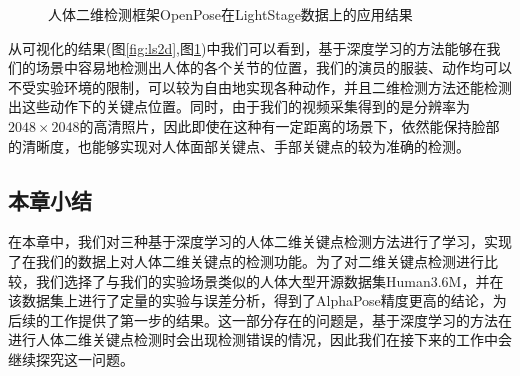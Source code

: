 \begin{figure}[htbp]
    \centering
    \caption{人体二维检测框架OpenPose在LightStage数据上的应用结果\label{fig:ls2dop}}
\end{figure}
从可视化的结果(图\ref{fig:ls2d},图\ref{fig:ls2dop})中我们可以看到，基于深度学习的方法能够在我们的场景中容易地检测出人体的各个关节的位置，我们的演员的服装、动作均可以不受实验环境的限制，可以较为自由地实现各种动作，并且二维检测方法还能检测出这些动作下的关键点位置。同时，由于我们的视频采集得到的是分辨率为\(2048\times 2048\)的高清照片，因此即使在这种有一定距离的场景下，依然能保持脸部的清晰度，也能够实现对人体面部关键点、手部关键点的较为准确的检测。

\subsection{本章小结}
在本章中，我们对三种基于深度学习的人体二维关键点检测方法进行了学习，实现了在我们的数据上对人体二维关键点的检测功能。为了对二维关键点检测进行比较，我们选择了与我们的实验场景类似的人体大型开源数据集Human3.6M，并在该数据集上进行了定量的实验与误差分析，得到了AlphaPose精度更高的结论，为后续的工作提供了第一步的结果。这一部分存在的问题是，基于深度学习的方法在进行人体二维关键点检测时会出现检测错误的情况，因此我们在接下来的工作中会继续探究这一问题。
